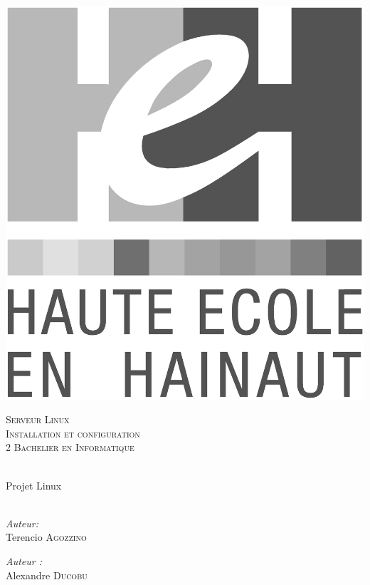 \begin{center}
  \includegraphics[scale=0.12]{textures/logo/heh_bw.eps}

  \vspace{1cm}

  \textsc{\LARGE Serveur Linux} \\ [0.5cm]
  \textsc{\Large Installation et configuration} \\ [0.5cm]

  \textsc{\large 2 Bachelier en Informatique} \\ [0.2cm]

  \begingroup
   \selectfont 

  \HRule \\ [0.4cm] {
    \huge Projet Linux \\ [0.2cm] 
  }
  \HRule \\ [1.3cm]
  \endgroup

  \begin{minipage}[t]{0.4 \textwidth} 
    \begin{flushleft} 
      \large \emph{Auteur:} \\ 
      Terencio \textsc{Agozzino}
    \end{flushleft} 
  \end{minipage}
  \begin{minipage}[t]{0.4 \textwidth}
    \begin{flushright} 
      \large \emph{Auteur :} \\ 
      Alexandre \textsc{Ducobu}
    \end{flushright} 
  \end{minipage}


\end{center}
